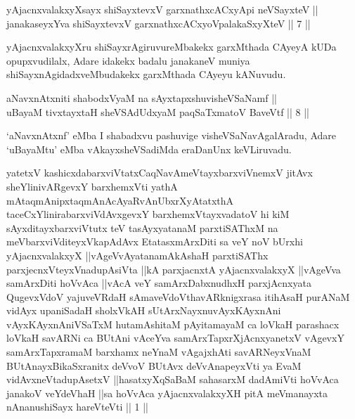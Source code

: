
\begin{shl}
yAjacnxvalakxyXsayx shiSayxtevxV garxnathxcACxyA\s pi neVSayxteV || \\
janakaseyxYva shiSayxtevxV garxnathxcACxyoVpalakaSxyXteV \hfill ||  7 ||  
\end{shl}

\begin{artha}
yAjacnxvalakxyXru shiSayxrAgiruvureMbakekx garxMthada CAyeyA kUDa opupxvudilalx, Adare idakekx badalu janakaneV muniya shiSayxnAgidadxveMbudakekx garxMthada CAyeyu kANuvudu.
\end{artha}


\begin{shl}
aNavxnAtxniti shabodxV\s yaM na sAyxtapxshuvisheVSaNamf || \\
uBayaM tivxtayxtaH sheVSAdUdxyaM paqSaTxmatoV BaveVtf \hfill ||  8 ||  
\end{shl}

\begin{artha}
`aNavxnAtxnf' eMba I shabadxvu pashuvige visheVSaNavAgalAradu, Adare `uBayaMtu' eMba vAkayxsheVSadiMda eraDanUnx keVLiruvadu.
\end{artha}

\begin{shl}
yatetxV kashicxdabarxviVtatxCaqNavAmeVtayxbarxviVnemxV jitAvx sheYlinivARgevxY barxhemxVti yathA mAtaqmAnipxtaqmAnAcAyaRvAnUbxrXyAtatxthA taceCxYlinirabarxviVdAvxgevxY barxhemxVtayxvadatoV hi kiM sAyxditayxbarxviVtutx teV tasAyxyatanaM parxtiSAThxM na meV\s barxviVditeyxVkapAdAvx EtatasxmArxDiti sa veY noV bUrxhi yAjacnxvalakxyX ||vAgeVvAyatanamAkAshaH parxtiSAThx parxjecnxVteyxVnadupAsiVta ||kA parxjacnxtA yAjacnxvalakxyX ||vAgeVva samArxDiti hoVvAca ||vAcA veY samArxDabxnudhxH parxjAcnxyata QugevxVdoV yajuveVRdaH sAmaveVdoV\s thavARknigxrasa itihAsaH purANaM vidAyx upaniSadaH sholxVkAH sUtArxNayxnuvAyxKAyxnAni vAyxKAyxnAniVSaTxM hutamAshitaM pAyitamayaM ca loVkaH parashacx loVkaH savARNi ca BUtAni vAceYva samArxTapxrXjAcnxyanetxV vAgevxY samArxTapxramaM barxhamx neYnaM vAgajxhAti savARNeyxVnaM BUtAnayxBikaSxranitx deVvoV BUtAvx deVvAnapeyxVti ya EvaM vidAvxneVtadupAsetxV ||hasatxyXqSaBaM sahasarxM dadAmiVti hoVvAca janakoV veYdeVhaH ||sa hoVvAca yAjacnxvalakxyXH pitA meV\s manayxta nAnanushiSayx hareVteVti || 1 ||
\end{shl}


